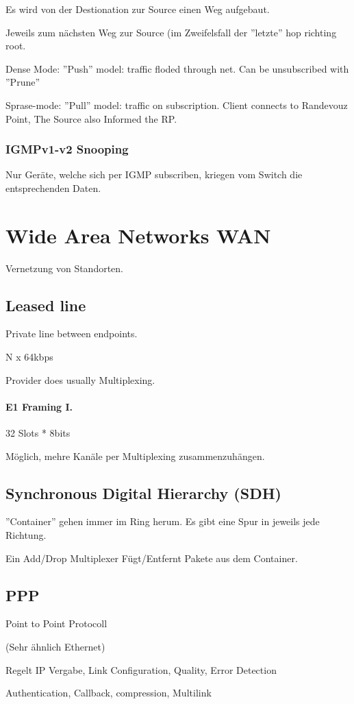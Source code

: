 Es wird von der Destionation zur Source einen Weg aufgebaut.

Jeweils zum nächsten Weg zur Source (im Zweifelsfall der ''letzte'' hop richting root.

Dense Mode: ''Push'' model: traffic floded through net. Can be unsubscribed with ''Prune''

Sprase-mode: ''Pull'' model: traffic on subscription. Client connects to Randevouz Point, The Source also Informed the RP.

\subsubsection{IGMPv1-v2 Snooping}

Nur Geräte, welche sich per IGMP subscriben, kriegen vom Switch die entsprechenden Daten.



\section{Wide Area Networks WAN}

Vernetzung von Standorten.

\subsection{Leased line}

Private line between endpoints.

N x 64kbps

Provider does usually Multiplexing.

\paragraph{E1 Framing I.}

32 Slots * 8bits

Möglich, mehre Kanäle per Multiplexing zusammenzuhängen.

\subsection{Synchronous Digital Hierarchy (SDH)}

''Container'' gehen immer im Ring herum. Es gibt eine Spur in jeweils jede Richtung.

Ein Add/Drop Multiplexer Fügt/Entfernt Pakete aus dem Container.

\subsection{PPP}

Point to Point Protocoll

(Sehr ähnlich Ethernet)

Regelt IP Vergabe, Link Configuration, Quality, Error Detection

Authentication, Callback, compression, Multilink






